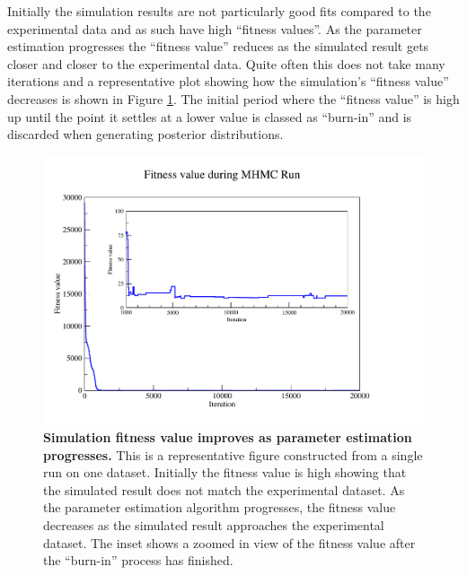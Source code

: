 Initially the simulation results are not particularly good fits compared to the experimental data and as such have high ``fitness values''. As the parameter estimation progresses the ``fitness value'' reduces as the simulated result gets closer and closer to the experimental data. Quite often this does not take many iterations and a representative plot showing how the simulation's ``fitness value'' decreases is shown in Figure \ref{fig:oxy_fitness}. The initial period where the ``fitness value'' is high up until the point it settles at a lower value is classed as ``burn-in'' and is discarded when generating posterior distributions.

\begin{figure}[tbp]
 \centering
 \includegraphics[width=14cm, trim=75px 50px 125px 25px]{./05-oxygenreduction/data/o2_fitness.pdf}
 \caption[Simulation fitness value improves as parameter estimation progresses]{{\bf Simulation fitness value improves as parameter estimation progresses.} This is a representative figure constructed from a single run on one dataset. Initially the fitness value is high showing that the simulated result does not match the experimental dataset. As the parameter estimation algorithm progresses, the fitness value decreases as the simulated result approaches the experimental dataset. The inset shows a zoomed in view of the fitness value after the ``burn-in'' process has finished.
 \label{fig:oxy_fitness}}
\end{figure}

